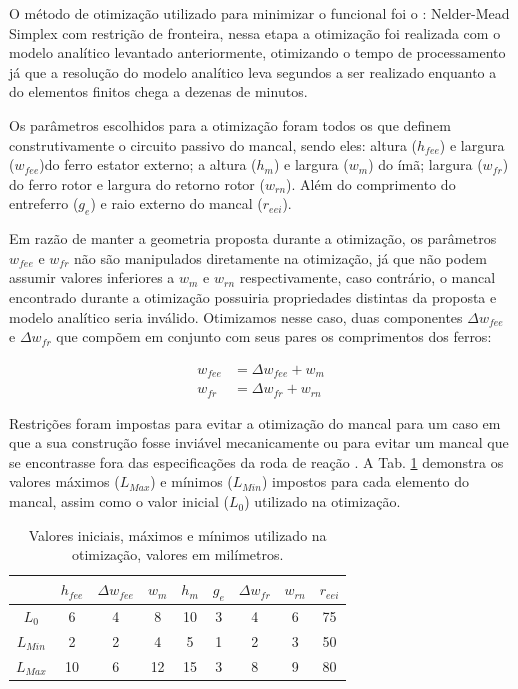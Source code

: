 O método de otimização utilizado para minimizar o funcional foi o :  Nelder-Mead Simplex com restrição de fronteira,  nessa etapa a otimização foi realizada com o modelo analítico levantado anteriormente, otimizando o tempo de processamento já que a resolução do modelo analítico leva segundos a ser realizado enquanto a do elementos finitos chega a dezenas de minutos.

Os parâmetros escolhidos para a otimização foram todos os que definem construtivamente o circuito passivo do mancal, sendo eles: altura  ($h_{fee}$) e largura  ($w_{fee}$)do ferro estator externo; a altura ($h_m$) e largura ($w_m$) do ímã;  largura ($w_{fr}$) do ferro rotor e largura do retorno rotor ($w_{rn}$). Além do comprimento do entreferro ($g_e$) e raio externo do mancal ($r_{eei}$).

Em razão de manter a geometria proposta durante a otimização, os parâmetros $w_{fee}$ e $w_{fr}$ não são manipulados diretamente na otimização, já que não podem assumir valores inferiores a $w_m$ e $w_{rn}$ respectivamente, caso contrário, o mancal encontrado durante a otimização possuiria propriedades distintas da proposta e modelo analítico seria inválido. Otimizamos nesse caso, duas componentes $\Delta w_{fee}$ e $\Delta w_{fr}$ que compõem em conjunto com seus pares os comprimentos dos ferros:

\begin{align}
w_{fee}  &= \Delta w_{fee} + w_m \\
w_{fr} &= \Delta w_{fr} + w_{rn}
\end{align}	

Restrições foram impostas para evitar a otimização do mancal para um caso em que a sua construção fosse inviável mecanicamente ou para evitar um mancal que se encontrasse fora das especificações da roda de reação . A Tab. \ref{tab:passivo:restrições} demonstra os valores máximos ($L_{Max}$) e mínimos ($L_{Min}$) impostos para cada elemento do mancal, assim como o valor inicial ($L_0$) utilizado na otimização.


\begin{table}[ht!]
	\centering
	\begin{tabular}{c c c c c c c c c}
		& $h_{fee}$ &$\Delta w_{fee}$ & $w_m$ & $h_m$  & $g_e$ & $\Delta w_{fr}$ & $w_{rn}$ & $r_{eei}$ \\ \hline \hline
		
		$L_{0}$ 	&  6 &   4 &    8 &    10 &   3 &  4 &   6 &    75 \\
		$L_{Min}$ &  2    &  2   &  4  &   5&    1  & 2  &  3&    50\\			
		$L_{Max}$ &  10 &  6 &  12  &   15  &  3  &  8  &   9   &   80		
	\end{tabular} 
	\caption{Valores iniciais, máximos e mínimos utilizado na otimização, valores em milímetros.}
	\label{tab:passivo:restrições} 
\end{table}


